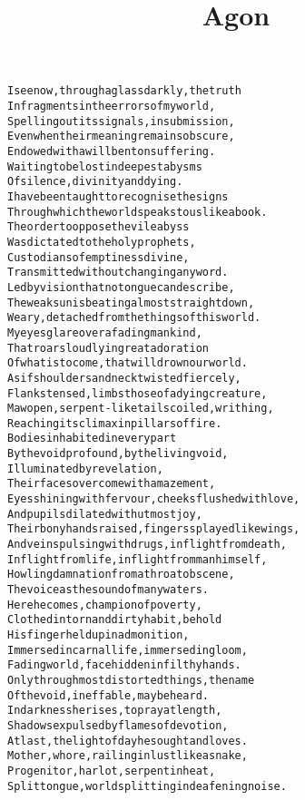 \documentclass{article}
\title{Agon}
\begin{document}
\maketitle

\clearpage

\begin{alltt}\normalfont
I see now, through a glass darkly, the truth
In fragments in the errors of my world,
Spelling out its signals, in submission,
Even when their meaning remains obscure,
Endowed with a will bent on suffering.
Waiting to be lost in deepest abysms
Of silence, divinity and dying.
I have been taught to recognise the signs
Through which the world speaks to us like a book.
The order to oppose the vile abyss
Was dictated to the holy prophets,
Custodians of emptiness divine,
Transmitted without changing any word.
Led by vision that no tongue can describe,
The weak sun is beating almost straight down,
Weary, detached from the things of this world.
My eyes glare over a fading mankind,
That roars loudly in great adoration
Of what is to come, that will drown our world.
As if shoulders and neck twisted fiercely,
Flanks tensed, limbs those of a dying creature,
Maw open, serpent-like tails coiled, writhing,
Reaching its climax in pillars of fire.
Bodies inhabited in every part
By the void profound, by the living void,
Illuminated by revelation,
Their faces overcome with amazement,
Eyes shining with fervour, cheeks flushed with love,
And pupils dilated with utmost joy,
Their bony hands raised, fingers splayed like wings,
And veins pulsing with drugs, in flight from death,
In flight from life, in flight from man himself,
Howling damnation from a throat obscene,
The voice as the sound of many waters.
Here he comes, champion of poverty,
Clothed in torn and dirty habit, behold
His finger held up in admonition,
Immersed in carnal life, immersed in gloom,
Fading world, face hidden in filthy hands.
Only through most distorted things, the name
Of the void, ineffable, may be heard.
In darkness he rises, to pray at length,
Shadows expulsed by flames of devotion,
At last, the light of day he sought and loves.
Mother, whore, railing in lust like a snake,
Progenitor, harlot, serpent in heat,
Split tongue, world splitting in deafening noise.
\end{alltt}
\end{document}
